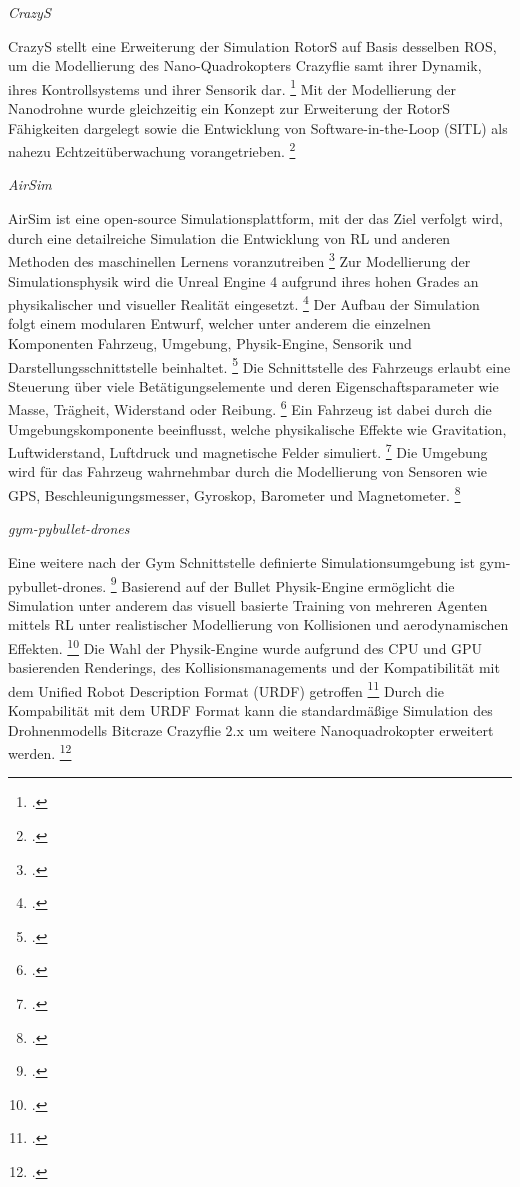 \textit{CrazyS}

CrazyS stellt eine Erweiterung der Simulation RotorS auf Basis desselben ROS, um die Modellierung des Nano-Quadrokopters Crazyflie samt ihrer Dynamik, ihres Kontrollsystems und ihrer Sensorik dar. \footcite[Vgl.][S. 81]{Silano.2020}
Mit der Modellierung der Nanodrohne wurde gleichzeitig ein Konzept zur Erweiterung der RotorS Fähigkeiten dargelegt sowie die Entwicklung von Software-in-the-Loop (SITL) als nahezu Echtzeitüberwachung vorangetrieben. \footcite[Vgl.][S. 82]{Silano.2020}

\textit{AirSim}

AirSim ist eine open-source Simulationsplattform, mit der das Ziel verfolgt wird, durch eine detailreiche Simulation die Entwicklung von RL und anderen Methoden des maschinellen Lernens voranzutreiben \footcite[Vgl.][S. 2]{Shah.2017}
Zur Modellierung der Simulationsphysik wird die Unreal Engine 4 aufgrund ihres hohen Grades an physikalischer und visueller Realität eingesetzt. \footcite[Vgl.][S. 1]{Shah.2017}
Der Aufbau der Simulation folgt einem modularen Entwurf, welcher unter anderem die einzelnen Komponenten Fahrzeug, Umgebung, Physik-Engine, Sensorik und Darstellungsschnittstelle beinhaltet. \footcite[Vgl.][S. 3]{Shah.2017}
Die Schnittstelle des Fahrzeugs erlaubt eine Steuerung über viele Betätigungselemente und deren Eigenschaftsparameter wie Masse, Trägheit, Widerstand oder Reibung. \footcite[Vgl.][S. 5]{Shah.2017}
Ein Fahrzeug ist dabei durch die Umgebungskomponente beeinflusst, welche physikalische Effekte wie Gravitation, Luftwiderstand, Luftdruck und magnetische Felder simuliert. \footcite[Vgl.][S. 6]{Shah.2017}
Die Umgebung wird für das Fahrzeug wahrnehmbar durch die Modellierung von Sensoren wie GPS, Beschleunigungsmesser, Gyroskop, Barometer und Magnetometer. \footcite[Vgl.][S. 9]{Shah.2017}


\textit{gym-pybullet-drones}

Eine weitere nach der Gym Schnittstelle definierte Simulationsumgebung ist gym-pybullet-drones. \footcite[Vgl.][S. 1]{Panerati.332021}
Basierend auf der Bullet Physik-Engine ermöglicht die Simulation unter anderem das visuell basierte Training von mehreren Agenten mittels RL unter realistischer Modellierung von Kollisionen und aerodynamischen Effekten. \footcite[Vgl.][S. 1]{Panerati.332021}
Die Wahl der Physik-Engine wurde aufgrund des CPU und GPU basierenden Renderings, des Kollisionsmanagements und der Kompatibilität mit dem Unified Robot Description Format (URDF) getroffen \footcite[Vgl.][S. 3]{Panerati.332021}
Durch die Kompabilität mit dem URDF Format kann die standardmäßige Simulation des Drohnenmodells Bitcraze Crazyflie 2.x um weitere Nanoquadrokopter erweitert werden. \footcite[Vgl.][S. 3]{Panerati.332021}